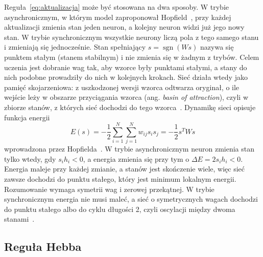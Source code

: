 Reguła~\eqref{eq:aktualizacja} może być stosowana na dwa sposoby. W trybie asynchronicznym, w którym model zaproponował Hopfield~\cite[s.~2555]{hopfield1982}, przy każdej aktualizacji zmienia stan jeden neuron, a kolejny neuron widzi już jego nowy stan. W trybie synchronicznym wszystkie neurony liczą pola z tego samego stanu i zmieniają się jednocześnie. Stan spełniający $s = \operatorname{sgn}(Ws)$ nazywa się punktem stałym (stanem stabilnym) i nie zmienia się w żadnym z trybów. Celem uczenia jest dobranie wag tak, aby wzorce były punktami stałymi, a stany do nich podobne prowadziły do nich w kolejnych krokach. Sieć działa wtedy jako pamięć skojarzeniowa: z uszkodzonej wersji wzorca odtwarza oryginał, o ile wejście leży w obszarze przyciągania wzorca (ang. \textit{basin of attraction}), czyli w zbiorze stanów, z których sieć dochodzi do tego wzorca~\cite[s.~2554]{hopfield1982}.
Dynamikę sieci opisuje funkcja energii
\begin{equation}
    E(s) = -\frac{1}{2} \sum_{i=1}^{N} \sum_{j=1}^{N} w_{ij} s_i s_j = -\frac{1}{2} s^T W s
    \label{eq:energia}
\end{equation}
wprowadzona przez Hopfielda~\cite[s.~2556]{hopfield1982}. W trybie asynchronicznym neuron zmienia stan tylko wtedy, gdy $s_i h_i < 0$, a energia zmienia się przy tym o $\Delta E = 2 s_i h_i < 0$. Energia maleje przy każdej zmianie, a stanów jest skończenie wiele, więc sieć zawsze dochodzi do punktu stałego, który jest minimum lokalnym energii. Rozumowanie wymaga symetrii wag i zerowej przekątnej. W trybie synchronicznym energia nie musi maleć, a sieć o symetrycznych wagach dochodzi do punktu stałego albo do cyklu długości 2, czyli oscylacji między dwoma stanami~\cite[s.~1581--1583]{bruck1990}.

\subsection{Reguła Hebba}
\label{sec:regula-hebba}

